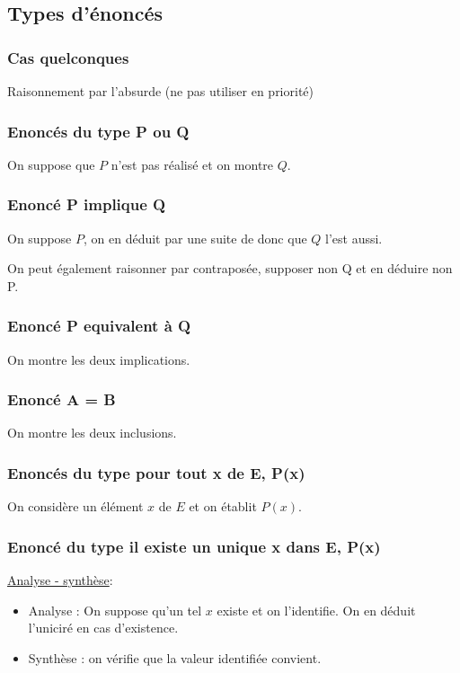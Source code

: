 \documentclass{prepacours}
\begin{document}
\subsection{Types d'énoncés}
\subsubsection{Cas quelconques}

Raisonnement par l'absurde (ne pas utiliser en priorité)

\subsubsection{Enoncés du type P ou Q }
On suppose que $P$ n'est pas réalisé et on montre $Q$.

\subsubsection{Enoncé P implique Q }

On suppose $P$, on en déduit par une suite de donc que $Q$ l'est aussi.

On peut également raisonner par contraposée, supposer non Q et en déduire non P. 

\subsubsection{Enoncé P equivalent à Q }

On montre les deux implications.

\subsubsection{Enoncé A = B }

On montre les deux inclusions. 

\subsubsection{Enoncés du type pour tout x de E, P(x)}

On considère un élément $x$ de $E$ et on établit $P(x)$. 

\subsubsection{Enoncé du type il existe un unique x dans E, P(x)}

\underline{Analyse - synthèse}:
\begin{itemize}
    \item Analyse : On suppose qu'un tel $x$ existe et on l'identifie. On en 
        déduit l'uniciré en cas d'existence. 
    \item Synthèse : on vérifie que la valeur identifiée convient. 
\end{itemize}
\end{document}
